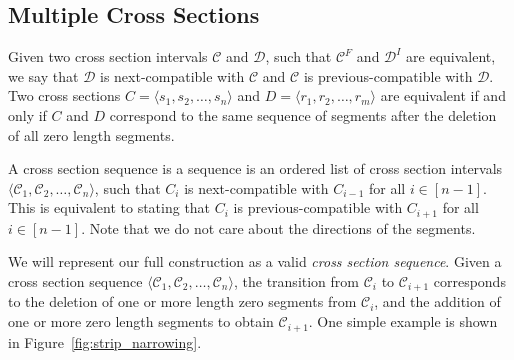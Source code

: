 \subsection{Multiple Cross Sections}
\label{sec:intervals}


\begin{definition}
\label{def:compatible}
Given two cross section intervals $\mathcal C$ and $\mathcal D$, such that $\mathcal C^F$ and $\mathcal D^I$ are equivalent,
we say that $\mathcal D$ is next-compatible with $\mathcal C$ and $\mathcal C$ is previous-compatible with $\mathcal D$.
Two cross sections $C = \langle s_1, s_2,\dots, s_n \rangle$ and $D = \langle r_1, r_2,\dots, r_m \rangle$ are equivalent
if and only if $C$ and $D$ correspond to the same sequence of segments after the deletion of all zero length segments.
\end{definition}

\begin{definition}
\label{def:cross_section_sequence}
A cross section sequence is a sequence is an ordered list of cross section intervals $ \langle \mathcal C_1, \mathcal C_2,\dots, \mathcal C_n \rangle$,
such that $C_{i}$ is next-compatible with $C_{i-1}$ for all $i\in [n-1]$.
This is equivalent to stating that $C_{i}$ is previous-compatible with $C_{i+1}$ for all $i\in [n-1]$.
Note that we do not care about the directions of the segments.
\end{definition}

We will represent our full construction as a valid \emph{cross section sequence}.
Given a cross section sequence $\langle \mathcal C_1, \mathcal C_2,\dots, \mathcal C_n \rangle$,
the transition from $\mathcal C_i$ to $\mathcal C_{i+1}$ corresponds to the deletion of one or more
length zero segments from $\mathcal C_i$, and the addition of one or more zero length segments to obtain $\mathcal C_{i+1}$.
One simple example is shown in Figure~\ref{fig:strip_narrowing}.

